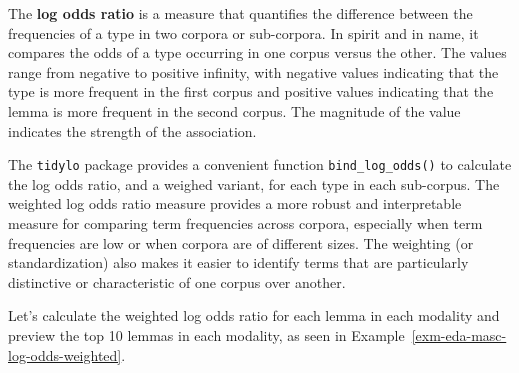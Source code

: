 \documentclass[
  letterpaper,
]{latex/krantz}
\theoremstyle{definition}
\theoremstyle{remark}
\begin{document}
The \textbf{log odds ratio} is a measure that quantifies the difference
between the frequencies of a type in two corpora or sub-corpora. In
spirit and in name, it compares the odds of a type occurring in one
corpus versus the other. The values range from negative to positive
infinity, with negative values indicating that the type is more frequent
in the first corpus and positive values indicating that the lemma is
more frequent in the second corpus. The magnitude of the value indicates
the strength of the association.

The \texttt{tidylo} package provides a convenient function
\texttt{bind\_log\_odds()} to calculate the log odds ratio, and a
weighed variant, for each type in each sub-corpus. The weighted log odds
ratio measure provides a more robust and interpretable measure for
comparing term frequencies across corpora, especially when term
frequencies are low or when corpora are of different sizes. The
weighting (or standardization) also makes it easier to identify terms
that are particularly distinctive or characteristic of one corpus over
another.

Let's calculate the weighted log odds ratio for each lemma in each
modality and preview the top 10 lemmas in each modality, as seen in
Example~\ref{exm-eda-masc-log-odds-weighted}.
\end{document}
